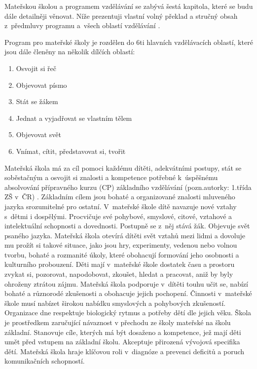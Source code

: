 	Mateřskou školou a programem vzdělávání se zabývá šestá kapitola, které se budu dále detailněji věnovat. Níže prezentuji vlastní volný překlad a stručný obsah z předmluvy programu a všech oblastí vzdělávání \citep{program}.

	Program pro mateřské školy je rozdělen do 6ti hlavních vzdělávacích oblastí, které jsou dále členěny na několik dílčích oblastí:


	\begin{enumerate}[1]
		\item Osvojit si řeč 
		\item Objevovat písmo 
		\item Stát se žákem 
		\item Jednat a vyjadřovat se vlastním tělem 
		\item Objevovat svět
		\item Vnímat, cítit, představovat si, tvořit
	\end{enumerate}

	Mateřská škola má za cíl pomoci každému dítěti, adekvátními postupy, stát se soběstačným a osvojit si znalosti a kompetence potřebné k úspěšnému absolvování přípravného kurzu (CP) základního vzdělávání (pozn.autorky: 1.třída ZŠ v ČR) . Základním cílem jsou bohaté a organizované  znalosti mluveného jazyka srozumitelné pro ostatní. V mateřské škole dítě navazuje nové vztahy s dětmi i dospělými. Procvičuje své pohybové, smyslové, citové, vztahové a intelektuální schopnosti a dovednosti. Postupně se z něj stává žák. Objevuje svět psaného jazyka. 
	Mateřská škola otevírá dítěti svět vztahů mezi lidmi a dovoluje mu prožít si takové situace, jako jsou hry, experimenty, vedenou nebo volnou tvorbu, bohaté a rozmanité úkoly, které obohacují formování jeho osobnosti a kulturního probouzení. 
	Děti mají v mateřské škole dostatek času a prostoru zvykat si, pozorovat, napodobovat, zkoušet, hledat a pracovat, aniž by byly ohroženy ztrátou zájmu. Mateřská škola podporuje v dítěti touhu učit se, nabízí bohaté a různorodé zkušenosti a obohacuje jejich pochopení. 
	Činnosti v mateřské škole musí nabízet širokou nabídku smyslových a pohybových zkušeností. Organizace dne respektuje biologický rytmus a potřeby dětí dle jejich věku. 
	Škola je prostředkem zaručující návaznost v přechodu ze školy mateřské na školu základní. Stanovuje cíle, kterých má být dosaženo a kompetence, jež mají děti umět před vstupem na základní školu. Akceptuje přirozená vývojová specifika dětí. Mateřská škola hraje klíčovou roli v diagnóze a prevenci deficitů a poruch komunikačních schopností.

